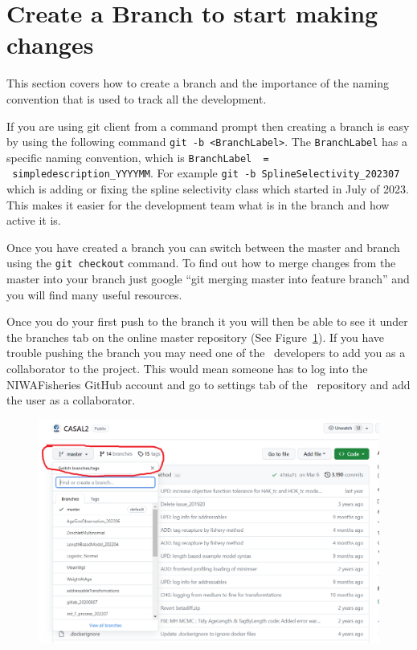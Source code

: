 \section{Create a Branch to start making changes\label{sec:maintain_repo}}

This section covers how to create a branch and the importance of the naming convention that is used to track all the development. 

If you are using git client from a command prompt then creating a branch is easy by using the following command \texttt{git -b <BranchLabel>}. The \texttt{BranchLabel} has a specific naming convention, which is  \texttt{BranchLabel \ = \ simpledescription\_YYYYMM}. For example \texttt{git -b SplineSelectivity\_202307} which is adding or fixing the spline selectivity class which started in July of 2023. This makes it easier for the development team what is in the branch and how active it is.

Once you have created a branch you can switch between the master and branch using the \texttt{git checkout} command. To find out how to merge changes from the master into your branch just google \enquote{git merging master into feature branch} and you will find many useful resources.

Once you do your first push to the branch it you will then be able to see it under the branches tab on the online master repository (See Figure~\ref{fig:branchtab}). If you have trouble pushing the branch you may need one of the \CNAME\ developers to add you as a collaborator to the project. This would mean someone has to log into the NIWAFisheries GitHub account and go to settings tab of the \CNAME\ repository and add the user as a collaborator.

\begin{figure}[!ht]
	\centering
	\includegraphics[scale=0.6]{Figures/branch_tab.png}
	\caption{}\label{fig:branchtab}
\end{figure}